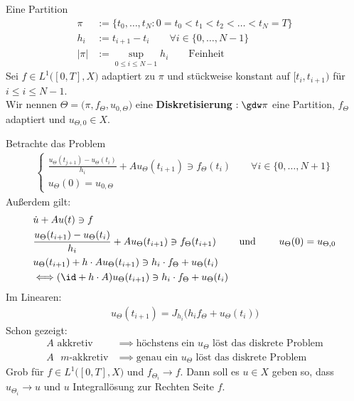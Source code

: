 \begin{definition}
Eine Partition
\begin{align*}
\pi&:=\big\lbrace t_0,\ldots,t_N: 0=t_0<t_1<t_2<\ldots<t_N=T\big\rbrace\\
h_i&:=t_{i+1}-t_i\qquad\forall i\in\lbrace0,\ldots,N-1\rbrace\\
|\pi|&:=\sup\limits_{0\leq i\leq N-1} h_i\qquad\text{Feinheit}
\end{align*}
Sei $f\in L^1\big([0,T],X\big)$ adaptiert zu $\pi$ und stückweise konstant auf $[t_i,t_{i+1})$ für $i\leq i\leq N-1$.\\
Wir nennen $\Theta=\big(\pi,f_\Theta,u_{0,\Theta}\big)$ eine \textbf{Diskretisierung} $:\gdw\pi$ eine Partition, $f_\Theta$ adaptiert und $u_{\Theta,0}\in X$.
\end{definition}
Betrachte das Problem
\begin{align}\label{eqETheta}\tag{$E_\Theta$}
\left\lbrace\begin{array}{l}
\frac{u_\Theta(t_{j+1})-u_\Theta(t_i)}{h_i}+Au_\Theta(t_{i+1})\ni f_\Theta(t_i)\qquad\forall i\in\lbrace0,\ldots,N+1\rbrace\\
u_\Theta(0)=u_{0,\Theta}
\end{array}\right.
\end{align}
Außerdem gilt:
\begin{align*}
&\dot{u}+Au(t)\ni f\\
&\frac{u_\Theta(t_{i+1})-u_\Theta(t_i)}{h_i}+Au_\Theta(t_{i+1})\ni f_\Theta(t_{i+1})
\qquad\text{ und }\qquad
u_\Theta(0)=u_{\Theta,0}\\
&u_\Theta(t_{i+1})+h\cdot A u_\Theta(t_{i+1})\ni h_i\cdot f_\Theta+u_\Theta(t_i)\\
&\Longleftrightarrow (\id+h\cdot A)u_\Theta(t_{i+1})\ni h_i\cdot f_\Theta+u_\Theta(t_i)
\end{align*}
Im Linearen:
\begin{align*}
u_\Theta(t_{i+1})=J_{h_i}\big(h_i f_\Theta+u_\Theta(t_i)\big)
\end{align*}
Schon gezeigt:
\begin{align*}
A\text{ akkretiv}&\implies\text{höchstens ein $u_\Theta$ löst das diskrete Problem}\\
A\text{ $m$-akkretiv}&\implies\text{genau ein $u_\Theta$ löst das diskrete Problem}
\end{align*}
Grob für $f\in L^1\big([0,T],X\big)$ und $f_{\Theta_i}\longrightarrow f$. Dann soll es $u\in X$ geben so, dass $u_{\Theta_i}\longrightarrow u$ und $u$ Integrallösung zur Rechten Seite $f$.

